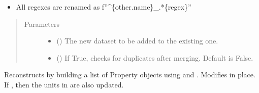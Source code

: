 \documentclass[letterpaper,10pt,english]{sphinxmanual}
\begin{document}
\begin{fulllineitems}
\begin{fulllineitems}
\begin{description}
\begin{itemize}
\item {} 
\sphinxAtStartPar
All regexes are renamed as f”\textasciicircum{}\{other.name\}\_.*\{regex\}”

\end{itemize}

\end{description}
\begin{quote}\begin{description}
\item[{Parameters}] \leavevmode\begin{itemize}
\item {} 
\sphinxAtStartPar
{} ({\hyperref[\detokenize{dataset:colabfit.tools.dataset.Dataset}]{}}) \textendash{} The new dataset to be added to the existing one.

\item {} 
\sphinxAtStartPar
{} () \textendash{} If True, checks for duplicates after merging. Default is False.

\end{itemize}

\end{description}\end{quote}

\end{fulllineitems}


\begin{fulllineitems}
\label{\detokenize{dataset:colabfit.tools.dataset.Dataset.parse_data}}
\sphinxAtStartPar
Re\sphinxhyphen{}constructs  by building a list of Property objects using
 and . Modifies  in
place. If , then the units in 
are also updated.

\end{fulllineitems}


\end{fulllineitems}
\end{document}
